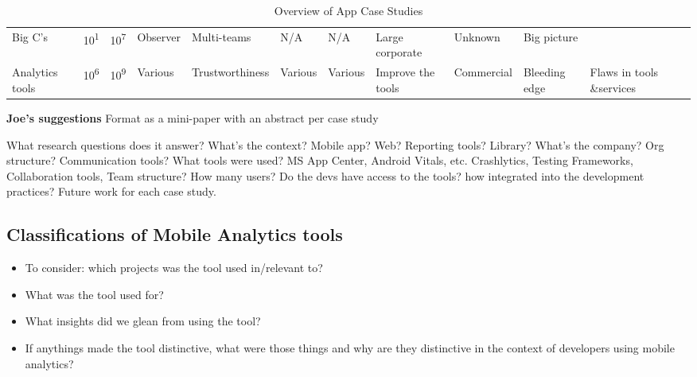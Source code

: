 \begin{sidewaystable}
\begin{tabular}{lrrlllllllll}
        \rowcolor{Gray}
        Big C's  &10\textsuperscript{1} &10\textsuperscript{7} &Observer &Multi-teams &N/A &N/A      &Large corporate         &Unknown   &Big picture &   \\
        Analytics tools &10\textsuperscript{6} &10\textsuperscript{9} &Various &Trustworthiness &Various &Various &Improve the tools &Commercial &Bleeding edge &Flaws in tools \&services \\
    \end{tabular}
    \caption{Overview of App Case Studies}
    \label{tab:overview_of_app_case_studies}
\end{sidewaystable}




\textbf{Joe's suggestions}
Format as a mini-paper with an abstract per case study

What research questions does it answer?
What’s the context? Mobile app? Web? Reporting tools? Library?
What’s the company? Org structure? Communication tools?
What tools were used? MS App Center, Android Vitals, etc. Crashlytics, Testing Frameworks, Collaboration tools,
Team structure?
How many users?
Do the devs have access to the tools? how integrated into the development practices?
Future work for each case study.

\subsection{Classifications of Mobile Analytics tools}

\begin{itemize}
    \item To consider: which projects was the tool used in/relevant to?
    \item What was the tool used for?
    \item What insights did we glean from using the tool?
    \item If anythings made the tool distinctive, what were those things and why are they distinctive in the context of developers using mobile analytics?
\end{itemize}
